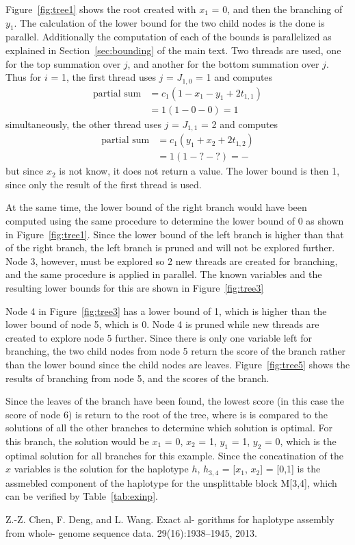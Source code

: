 \documentclass[10pt,twocolumn]{article}
\begin{document}
Figure~\ref{fig:tree1} shows the root created with $x_1$ = 0, and then the branching of $y_1$. The calculation
of the lower bound for the two child nodes is the done is parallel. Additionally the computation of each of
the bounds is parallelized as explained in Section~\ref{sec:bounding} of the main text. Two threads are used, 
one for the top summation over $j$,
and another for the bottom summation over $j$. Thus for $i$ = 1, the first thread uses $j$ = $J_{1,0}$ = 1 and
computes
\begin{align*}
    \textrm{partial sum} &= c_1(1 - x_1 - y_1 + 2t_{1,1}) \\
                         &= 1(1 - 0 - 0) = 1
\end{align*}
simultaneously, the other thread uses $j$ = $J_{1,1}$ = 2 and computes
\begin{align*}
    \textrm{partial sum} &= c_1(y_1 + x_2 + 2t_{1,2}) \\
                         &= 1(1 - ? - ?) = -
\end{align*}
but since $x_2$ is not know, it does not return a value. The lower bound is then 1, since only the result of
the first thread is used.

At the same time, the lower bound of the right branch would have been computed using the same procedure to
determine the lower bound of 0 as shown in Figure~\ref{fig:tree1}.
Since the lower bound of the left branch is higher than that of the right branch, the left branch is pruned and
will not be explored further. Node 3, however, must be explored so 2 new threads are created for branching, 
and the same procedure is applied in parallel. The known variables and the resulting lower bounds for
this are shown in Figure~\ref{fig:tree3}

Node 4 in Figure~\ref{fig:tree3} has a lower bound of 1, which is higher than the lower bound of node 5, which
is 0. Node 4 is pruned while new threads are created to explore node 5 further. Since there is only one
variable left for branching, the two child nodes from node 5 return the score of the branch rather than the lower
bound since the child nodes are leaves. Figure~\ref{fig:tree5} shows the results of branching from node 5,
and the scores of the branch.

Since the leaves of the branch have been found, the lowest score (in this case the score of node 6) is return
to the root of the tree, where is is compared to the solutions of all the other branches to determine which
solution is optimal. For this branch, the solution would be $x_1$ = 0, $x_2$ = 1, $y_1$ = 1, $y_2$ = 0, which is
the optimal solution for all branches for this example. Since the concatination of the $x$ variables is the 
solution for the haplotype $h$, $h_{3,4}$ = [$x_1$, $x_2$] = [0,1] is the assmebled component of the haplotype
for the unsplittable block M[3,4], which can be verified by
Table~\ref{tab:exinp}.

\begin{thebibliography}{99}
        Z.-Z. Chen, F. Deng, and L. Wang. Exact al-
        gorithms for haplotype assembly from whole-
        genome sequence data. 29(16):1938–1945, 2013.
\end{thebibliography}
\end{document}
